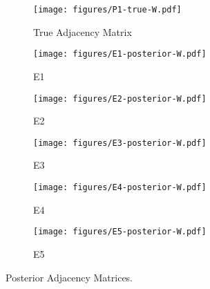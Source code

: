 \begin{figure}[t]
	\centering
	\begin{subfigure}{0.31\textwidth}
		\centering
		\texttt{[image: figures/P1-true-W.pdf]}
		\caption{True Adjacency Matrix}
	\end{subfigure}
	\begin{subfigure}{0.31\textwidth}
		\centering
		\texttt{[image: figures/E1-posterior-W.pdf]}
		\caption{E1}
	\end{subfigure}
	\begin{subfigure}{0.31\textwidth}
		\centering
		\texttt{[image: figures/E2-posterior-W.pdf]}
		\caption{E2}
	\end{subfigure}
	\begin{subfigure}{0.31\textwidth}
		\centering
		\texttt{[image: figures/E3-posterior-W.pdf]}
		\caption{E3}
	\end{subfigure}
	\begin{subfigure}{0.31\textwidth}
		\centering
		\texttt{[image: figures/E4-posterior-W.pdf]}
		\caption{E4}
	\end{subfigure}
	\begin{subfigure}{0.31\textwidth}
		\centering
		\texttt{[image: figures/E5-posterior-W.pdf]}
		\caption{E5}
	\end{subfigure}
	\caption{Posterior Adjacency Matrices.}
	\label{fig:E-posterior}
\end{figure}
